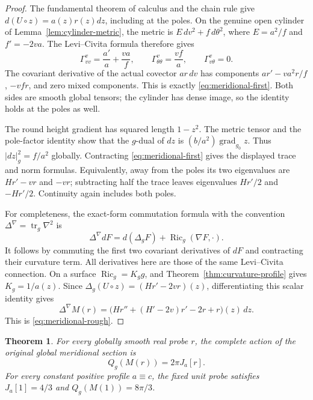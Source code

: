 \documentclass[11pt]{article}
\newtheorem{theorem}{Theorem}[section]
\begin{document}
\begin{proof}
The fundamental theorem of calculus and the chain rule give
$d(U\circ z)=a(z)r(z)dz$, including at the poles. On the genuine open
cylinder of Lemma~\ref{lem:cylinder-metric}, the metric is
$E\,dv^2+f\,d\theta^2$, where $E=a^2/f$ and $f'=-2va$.
The Levi--Civita formula therefore gives
\[
 \Gamma^v_{vv}=\frac{a'}a+\frac{va}{f},\qquad
 \Gamma^v_{\theta\theta}=\frac{vf}{a},\qquad
 \Gamma^v_{v\theta}=0.
\]
The covariant derivative of the actual covector $ar\,dv$ has components
$ar'-va^2r/f$, $-vfr$, and zero mixed components. This is exactly
\eqref{eq:meridional-first}. Both sides are smooth global tensors;
the cylinder has dense image, so the identity holds at the poles as well.

The round height gradient has squared length $1-z^2$. The metric tensor
and the pole-factor identity show that the $g$-dual of $dz$ is
$(b/a^2)\operatorname{grad}_{g_0}z$. Thus $|dz|_g^2=f/a^2$ globally.
Contracting \eqref{eq:meridional-first} gives the displayed trace and norm
formulas. Equivalently, away from the poles its two eigenvalues are
$Hr'-vr$ and $-vr$; subtracting half the trace leaves eigenvalues
$Hr'/2$ and $-Hr'/2$. Continuity again includes both poles.

For completeness, the exact-form commutation formula with the convention
$\Delta^\nabla=\operatorname{tr}_g\nabla^2$ is
\[
 \Delta^\nabla dF=d(\Delta_g F)+\operatorname{Ric}_g(\nabla F,\cdot).
\]
It follows by commuting the first two covariant derivatives of $dF$
and contracting their curvature term. All derivatives here are those
of the same Levi--Civita connection. On a surface
$\operatorname{Ric}_g=K_g g$, and Theorem~\ref{thm:curvature-profile}
gives $K_g=1/a(z)$. Since
$\Delta_g(U\circ z)=(Hr'-2vr)(z)$, differentiating this scalar identity
gives
\[
 \Delta^\nabla M(r)
 =\bigl(Hr''+(H'-2v)r'-2r+r\bigr)(z)\,dz.
\]
This is \eqref{eq:meridional-rough}.
\end{proof}

\begin{theorem}\label{thm:meridional-reduction}
For every globally smooth real probe $r$, the complete action of the
original global meridional section is
\[
 Q_g(M(r))=2\pi J_a[r].
\]
For every constant positive profile $a\equiv c$, the fixed unit probe
satisfies $J_a[1]=4/3$ and $Q_g(M(1))=8\pi/3$.
\end{theorem}
\end{document}
